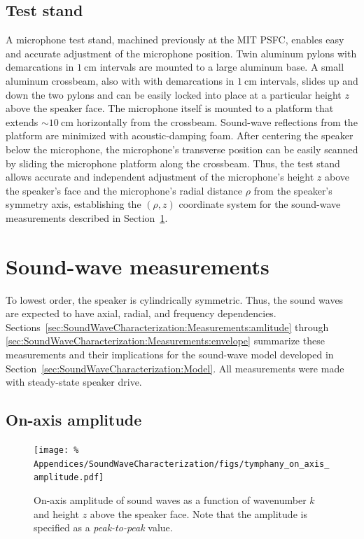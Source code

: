 \subsection{Test stand}
\label{sec:SoundWaveCharacterization:Hardware:test_stand}
A microphone test stand, machined previously at the MIT PSFC,
enables easy and accurate adjustment of the microphone position.
Twin aluminum pylons with demarcations in $\SI{1}{\centi\meter}$ intervals
are mounted to a large aluminum base.
A small aluminum crossbeam,
also with with demarcations in $\SI{1}{\centi\meter}$ intervals,
slides up and down the two pylons and can be easily locked into place
at a particular height $z$ above the speaker face.
The microphone itself is mounted to a platform
that extends $\sim\SI{10}{\centi\meter}$ horizontally
from the crossbeam.
Sound-wave reflections from the platform are minimized
with acoustic-damping foam.
After centering the speaker below the microphone,
the microphone's transverse position can be easily scanned
by sliding the microphone platform along the crossbeam.
Thus, the test stand allows accurate and independent adjustment of
the microphone's height $z$ above the speaker's face and
the microphone's radial distance $\rho$ from the speaker's symmetry axis,
establishing the $(\rho, z)$ coordinate system
for the sound-wave measurements described in
Section~\ref{sec:SoundWaveCharacterization:Measurements}.


\section{Sound-wave measurements}
\label{sec:SoundWaveCharacterization:Measurements}
To lowest order, the speaker is cylindrically symmetric.
Thus, the sound waves are expected to have
axial, radial, and frequency dependencies.
Sections~\ref{sec:SoundWaveCharacterization:Measurements:amlitude} through
\ref{sec:SoundWaveCharacterization:Measurements:envelope}
summarize these measurements and their implications
for the sound-wave model developed in
Section~\ref{sec:SoundWaveCharacterization:Model}.
All measurements were made with steady-state speaker drive.


\subsection{On-axis amplitude}
\begin{figure}
  \centering
  \texttt{[image: \%
    Appendices/SoundWaveCharacterization/figs/tymphany\_on\_axis\_amplitude.pdf]}
  \caption[On-axis amplitude of sound waves]{%
    On-axis amplitude of sound waves as a function of
    wavenumber $k$ and height $z$ above the speaker face.
    Note that the amplitude is specified
    as a \emph{peak-to-peak} value.
  }
\label{fig:SoundWaveCharacterization:tymphany_on_axis_amplitude}
\end{figure}

